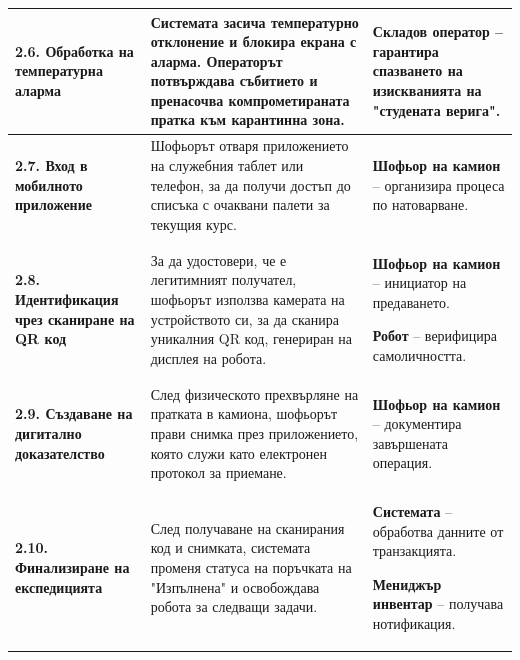 \documentclass[12pt, a4paper]{article}
\begin{document}
\begin{xltabular}{\textwidth}{|>{\RaggedRight\arraybackslash}p{4cm}|>{\RaggedRight\arraybackslash}X|>{\RaggedRight\arraybackslash}X|}
\textbf{2.6. Обработка на температурна аларма} & Системата засича температурно отклонение и блокира екрана с аларма. Операторът потвърждава събитието и пренасочва компрометираната пратка към карантинна зона. & \textbf{Складов оператор} – гарантира спазването на изискванията на "студената верига". \\ \hline

\textbf{2.7. Вход в мобилното приложение} & Шофьорът отваря приложението на служебния таблет или телефон, за да получи достъп до списъка с очаквани палети за текущия курс. & \textbf{Шофьор на камион} – организира процеса по натоварване. \\ \hline

\textbf{2.8. Идентификация чрез сканиране на QR код} & За да удостовери, че е легитимният получател, шофьорът използва камерата на устройството си, за да сканира уникалния QR код, генериран на дисплея на робота. & \textbf{Шофьор на камион} – инициатор на предаването.\par\medskip \textbf{Робот} – верифицира самоличността. \\ \hline

\textbf{2.9. Създаване на дигитално доказателство} & След физическото прехвърляне на пратката в камиона, шофьорът прави снимка през приложението, която служи като електронен протокол за приемане. & \textbf{Шофьор на камион} – документира завършената операция. \\ \hline

\textbf{2.10. Финализиране на експедицията} & След получаване на сканирания код и снимката, системата променя статуса на поръчката на "Изпълнена" и освобождава робота за следващи задачи. & \textbf{Системата} – обработва данните от транзакцията.\par\medskip \textbf{Мениджър инвентар} – получава нотификация. \\ \hline

\end{xltabular}
\end{document}
